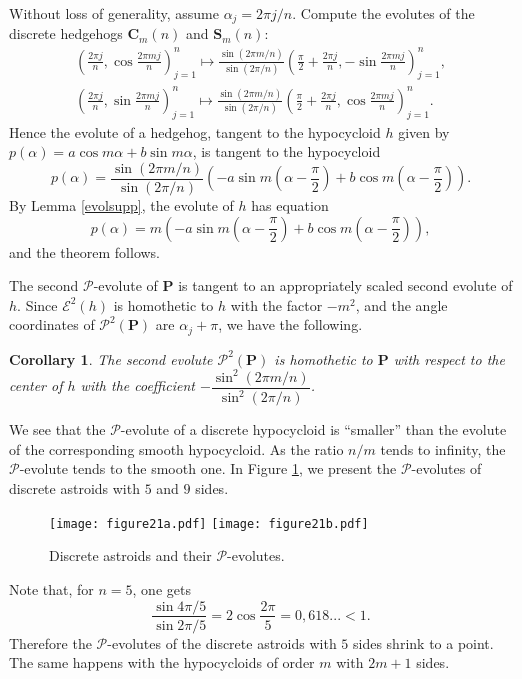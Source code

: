 \documentclass[12pt]{article}
\makeatletter
\newtheorem{corollary}[lemma]{Corollary}
\renewenvironment{proof}[1][\proofname] 
{\par\pushQED{\qed}\normalfont\topsep6\p@\@plus6\p@\relax\trivlist\item[\hskip\labelsep\bfseries#1\@addpunct{.}]\ignorespaces}{\popQED\endtrivlist\@endpefalse}
\newcommand{\Pev}{\mathcal{P}}
\newcommand{\E}{\mathcal{E}}
\renewcommand{\P}{\mathbf{P}}
\makeatother
\begin{document}
\begin{proof}
Without loss of generality, assume $\alpha_j = 2\pi j/n$. Compute the evolutes of the discrete hedgehogs $\mathbf{C}_m(n)$ and $\mathbf{S}_m(n)$:
\begin{gather*}
\left( \frac{2\pi j}n, \cos \frac{2\pi m j}n \right)_{j=1}^n \mapsto \frac{\sin(2\pi m/n)}{\sin(2\pi/n)} \left( \frac{\pi}2 + \frac{2\pi j}n, -\sin \frac{2\pi m j}n \right)_{j=1}^n,\\ \left( \frac{2\pi j}n, \sin \frac{2\pi m j}n \right)_{j=1}^n \mapsto \frac{\sin(2\pi m/n)}{\sin(2\pi/n)} \left( \frac{\pi}2 + \frac{2\pi j}n, \cos \frac{2\pi m j}n \right)_{j=1}^n.
\end{gather*}
Hence the evolute of a hedgehog, tangent to the hypocycloid $h$ given by $p(\alpha) = a\cos m\alpha + b\sin m\alpha$, is tangent to the hypocycloid
\[ p(\alpha) = \frac{\sin(2\pi m/n)}{\sin(2\pi/n)} \left(-a\sin m\left(\alpha - \frac{\pi}2\right) + b\cos m\left(\alpha - \frac{\pi}2\right)\right). \]
By Lemma \ref{evolsupp}, the evolute of $h$ has equation $$p(\alpha) = m \left(-a\sin m\left(\alpha - \dfrac{\pi}2\right) + b\cos m\left(\alpha - \dfrac{\pi}2\right)\right),$$
and the theorem follows.
\end{proof}

The second $\Pev$-evolute of $\P$ is tangent to an appropriately scaled second evolute of $h$. Since $\E^2(h)$ is homothetic to $h$ with the factor $-m^2$, and the angle coordinates of $\Pev^2(\P)$ are $\alpha_j + \pi$, we have the following.
\begin{corollary} \label{corEvolDHPerp}
The second evolute $\Pev^2(\P)$ is homothetic to $\P$ with respect to the center of $h$ with the coefficient $-\dfrac{\sin^2(2\pi m/n)}{\sin^2(2\pi/n)}$.
\end{corollary}

We see that the $\Pev$-evolute of a discrete hypocycloid is ``smaller'' than the evolute of the corresponding smooth hypocycloid. As the ratio $n/m$ tends to infinity, the $\Pev$-evolute tends to the smooth one. In  Figure \ref{9and5},  we present the $\Pev$-evolutes of discrete astroids with $5$ and $9$ sides.

\begin{figure}[htbp]
	\centering
	\texttt{[image: figure21a.pdf]}
	\texttt{[image: figure21b.pdf]}
	\caption{Discrete astroids and their $\Pev$-evolutes.}
	\label{9and5}
\end{figure}

Note that, for $n=5$, one gets 
$$\dfrac{\sin4\pi/5}{\sin2\pi/5} = 2 \cos\dfrac{2\pi}5 = 0,618...<1.$$  
Therefore the $\Pev$-evolutes of the discrete astroids with $5$ sides shrink to a point. The same happens with the hypocycloids of order $m$ with $2m+1$ sides. 
\end{document}
